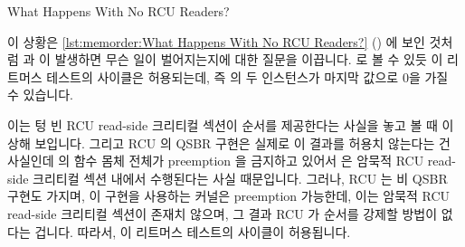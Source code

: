 \begin{listing}[tbp]

\caption{What Happens With No RCU Readers?}
\label{lst:memorder:What Happens With No RCU Readers?}
\end{listing}

이 상황은
\cref{lst:memorder:What Happens With No RCU Readers?}
()
에 보인 것처럼  과  이 발생하면 무슨
일이 벌어지는지에 대한 질문을 이끕니다.
 로 볼 수 있듯 이 리트머스 테스트의 사이클은 허용되는데, 즉  의
두 인스턴스가 마지막 값으로 0을 가질 수 있습니다.

이는 텅 빈 RCU read-side 크리티컬 섹션이 순서를 제공한다는 사실을 놓고 볼 때
이상해 보입니다.
그리고 RCU 의 QSBR 구현은 실제로 이 결과를 허용치 않는다는 건 사실인데
 의 함수 몸체 전체가 preemption 을 금지하고 있어서  은 암묵적
RCU read-side 크리티컬 섹션 내에서 수행된다는 사실 때문입니다.
그러나, RCU 는 비 QSBR 구현도 가지며, 이 구현을 사용하는 커널은 preemption
가능한데, 이는 암묵적 RCU read-side 크리티컬 섹션이 존재치 않으며, 그 결과 RCU
가 순서를 강제할 방법이 없다는 겁니다.
따라서, 이 리트머스 테스트의 사이클이 허용됩니다.

